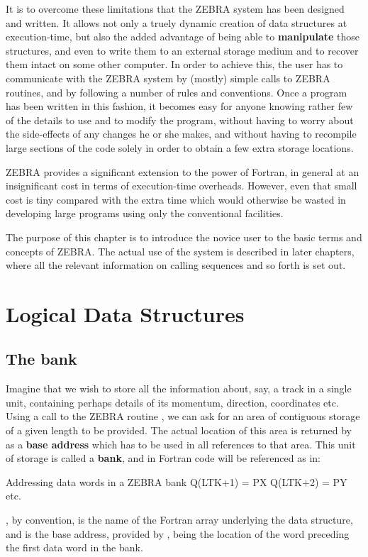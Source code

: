 It is to overcome these limitations that the ZEBRA system has been
designed and written. It allows not only a truely dynamic
creation of data structures at execution-time, but also the added
advantage of being able to
{\bf manipulate} those structures, and even to write them to an external
storage medium and to recover them intact on some other computer.
In order to achieve this, the
user has to communicate with the ZEBRA system by (mostly) simple calls
to ZEBRA routines, and by following a number of rules and conventions.
Once a program has been written in this fashion, it becomes easy
for anyone knowing rather few of the details to use and to modify the
program, without having to worry about the side-effects of any changes
he or she makes, and without having to recompile large sections of the
code solely in order to obtain a few extra storage locations.
 
ZEBRA provides a significant extension to the power of Fortran, in
general at an insignificant cost in terms of execution-time overheads.
However, even that small cost is tiny compared with the extra time which
would otherwise be wasted in developing large programs using only the
conventional facilities.
 
The purpose of this chapter is to introduce the novice user to the basic
terms and concepts of ZEBRA. The actual use of the system
is described in later
chapters, where all the relevant information on calling sequences and so
forth is set out.

\section{Logical Data Structures}
\subsection{The bank}

Imagine that we wish to store all the information about, say, a track in
a single unit, containing perhaps details of its momentum, direction,
coordinates etc. Using a call to the ZEBRA routine , we can ask
for an area of contiguous storage of a given length to be provided. The
actual location of this area is returned by  as a
{\bf base address} which has to be used in all references to that area.
This unit of storage is called a
{\bf bank}, and in Fortran code will be referenced as in:
\newpage
\begin{XMPt}{Addressing data words in a ZEBRA bank}
      Q(LTK+1) = PX
      Q(LTK+2) = PY
      etc.
\end{XMPt}
, by convention, is the name of the Fortran array underlying the
data structure, and  is the base address,
provided by , being the location of the word
preceding the first data word in the bank.
 

